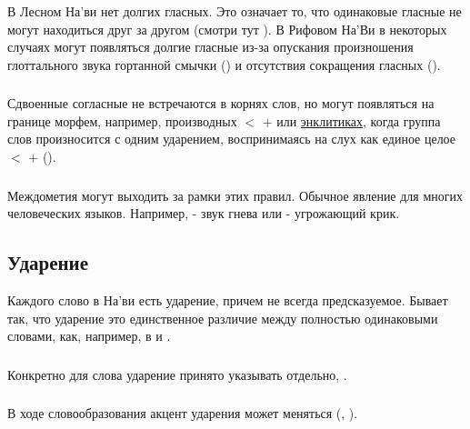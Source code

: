\subsubsection{} В Лесном На'ви нет долгих гласных. Это означает то, что одинаковые гласные не могут находиться друг за другом (смотри тут
).  В Рифовом На'Ви в некоторых случаях могут появляться долгие гласные из-за опускания произношения глоттального звука гортанной смычки () и отсутствия сокращения гласных
(). 

\subsubsection{} Сдвоенные согласные не встречаются в корнях слов, но могут появляться на границе морфем, например, производных
 $<$  $+$  или \href{https://ru.wikipedia.org/wiki/%D0%AD%D0%BD%D0%BA%D0%BB%D0%B8%D1%82%D0%B8%D0%BA%D0%B0}
{энклитиках}, 
когда группа слов произносится с одним ударением, воспринимаясь на слух как единое целое 
 $<$  $+$  ().

\subsubsection{} Междометия могут выходить за рамки этих правил. Обычное явление для многих человеческих языков. Например,  - звук гнева или 
 - угрожающий крик.


\subsection{Ударение}
Каждого слово в На'ви есть ударение, причем не всегда предсказуемое.  Бывает так, что ударение это единственное различие между полностью одинаковыми словами, как, например, в  
и  .

\subsubsection{} Конкретно для слова  ударение принято указывать отдельно, .

\subsubsection{} В ходе словообразования акцент ударения может меняться
(, ).

